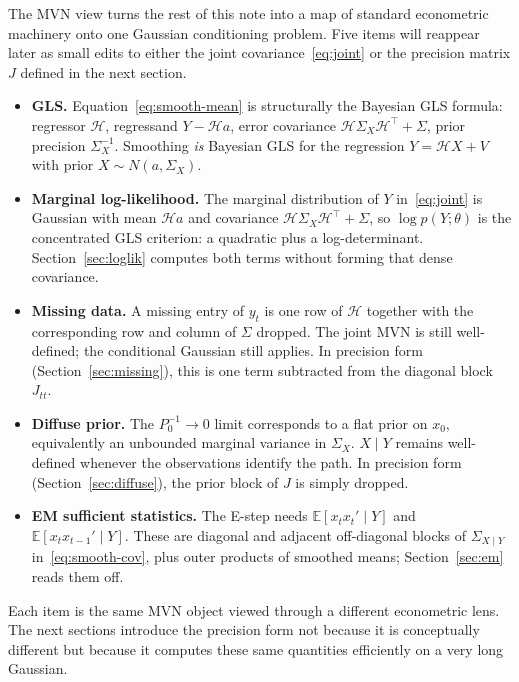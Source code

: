 \documentclass[11pt]{article}
\newcommand{\E}{\mathbb E}
\begin{document}
The MVN view turns the rest of this note into a map of standard
econometric machinery onto one Gaussian conditioning problem.  Five
items will reappear later as small edits to either the joint
covariance~\eqref{eq:joint} or the precision matrix $J$ defined in the
next section.
\begin{itemize}[leftmargin=2em]
\item \textbf{GLS.}  Equation~\eqref{eq:smooth-mean} is structurally
  the Bayesian GLS formula: regressor $\mathcal H$, regressand
  $Y-\mathcal Ha$, error covariance
  $\mathcal H\Sigma_X\mathcal H^\top+\Sigma$, prior precision
  $\Sigma_X^{-1}$.  Smoothing \emph{is} Bayesian GLS for the
  regression $Y=\mathcal HX+V$ with prior $X\sim N(a,\Sigma_X)$.
\item \textbf{Marginal log-likelihood.}  The marginal distribution of
  $Y$ in~\eqref{eq:joint} is Gaussian with mean $\mathcal Ha$ and
  covariance $\mathcal H\Sigma_X\mathcal H^\top+\Sigma$, so
  $\log p(Y;\theta)$ is the concentrated GLS criterion: a quadratic
  plus a log-determinant.  Section~\ref{sec:loglik} computes both
  terms without forming that dense covariance.
\item \textbf{Missing data.}  A missing entry of $y_t$ is one row of
  $\mathcal H$ together with the corresponding row and column of
  $\Sigma$ dropped.  The joint MVN is still well-defined; the
  conditional Gaussian still applies.  In precision form
  (Section~\ref{sec:missing}), this is one term subtracted from the
  diagonal block $J_{tt}$.
\item \textbf{Diffuse prior.}  The $P_0^{-1}\to 0$ limit corresponds
  to a flat prior on $x_0$, equivalently an unbounded marginal
  variance in $\Sigma_X$.  $X\mid Y$ remains well-defined whenever
  the observations identify the path.  In precision form
  (Section~\ref{sec:diffuse}), the prior block of $J$ is simply
  dropped.
\item \textbf{EM sufficient statistics.}  The E-step needs
  $\E[x_t x_t'\mid Y]$ and $\E[x_t x_{t-1}'\mid Y]$.  These are
  diagonal and adjacent off-diagonal blocks of
  $\Sigma_{X\mid Y}$ in~\eqref{eq:smooth-cov}, plus outer products
  of smoothed means; Section~\ref{sec:em} reads them off.
\end{itemize}
Each item is the same MVN object viewed through a different
econometric lens.  The next sections introduce the precision form not
because it is conceptually different but because it computes these
same quantities efficiently on a very long Gaussian.
\end{document}
